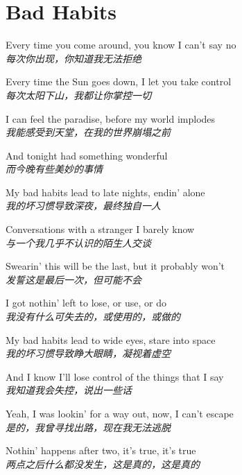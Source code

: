 \section{Bad Habits}

\thispagestyle{empty}


\begin{spacing}{1.5}
\begin{flushleft}
Every time you come around, you know I can't say no\\
\textit{每次你出现，你知道我无法拒绝}\lyricspace

Every time the Sun goes down, I let you take control\\
\textit{每次太阳下山，我都让你掌控一切}\lyricspace

I can feel the paradise, before my world implodes\\
\textit{我能感受到天堂，在我的世界崩塌之前}\lyricspace

And tonight had something wonderful\\
\textit{而今晚有些美妙的事情}\lyricspace

My bad habits lead to late nights, endin' alone\\
\textit{我的坏习惯导致深夜，最终独自一人}\lyricspace

Conversations with a stranger I barely know\\
\textit{与一个我几乎不认识的陌生人交谈}\lyricspace

Swearin' this will be the last, but it probably won't\\
\textit{发誓这是最后一次，但可能不会}\lyricspace

I got nothin' left to lose, or use, or do\\
\textit{我没有什么可失去的，或使用的，或做的}\lyricspace

My bad habits lead to wide eyes, stare into space\\
\textit{我的坏习惯导致睁大眼睛，凝视着虚空}\lyricspace

And I know I'll lose control of the things that I say\\
\textit{我知道我会失控，说出一些话}\lyricspace

Yeah, I was lookin' for a way out, now, I can't escape\\
\textit{是的，我曾寻找出路，现在我无法逃脱}\lyricspace

Nothin' happens after two, it's true, it's true\\
\textit{两点之后什么都没发生，这是真的，这是真的}\lyricspace


\end{flushleft}
\end{spacing}
